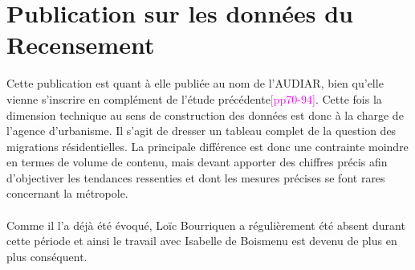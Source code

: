 \documentclass{bredele}
\begin{document}
\section{Publication sur les données du Recensement}
Cette publication est quant à elle publiée au nom de l’AUDIAR, bien qu’elle vienne s’inscrire en complément de l’étude précédente\textcolor{magenta}{[pp70-94]}. Cette fois la dimension technique au sens de construction des données est donc à la charge de l’agence d’urbanisme. Il s’agit de dresser un tableau complet de la question des migrations résidentielles. La principale différence est donc une contrainte moindre en termes de volume de contenu, mais devant apporter des chiffres précis afin d’objectiver les tendances ressenties et dont les mesures précises se font rares concernant la métropole.
\\\\Comme il l’a déjà été évoqué, Loïc Bourriquen a régulièrement été absent durant cette période et ainsi le travail avec Isabelle de Boismenu est devenu de plus en plus conséquent.
\end{document}

